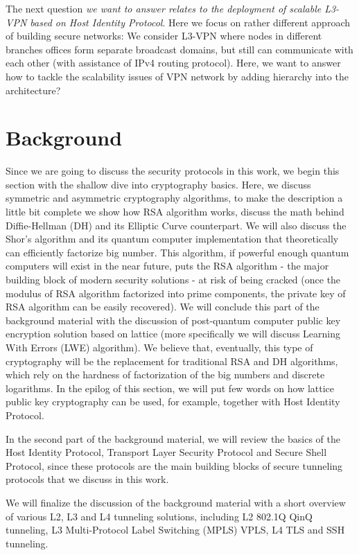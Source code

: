 The next question {\it we want to answer relates to the deployment of scalable L3-VPN 
based on Host Identity Protocol}. Here we focus on rather different approach of building 
secure networks: We consider L3-VPN where nodes in different branches offices form separate 
broadcast domains, but still can communicate with each other (with assistance of IPv4 
routing protocol). Here, we want to answer how to tackle the scalability issues of 
VPN network by adding hierarchy into the architecture?  


\chapter{Background}

Since we are going to discuss the security protocols in this work, we begin 
this section with the shallow dive into cryptography basics. Here, we discuss 
symmetric and asymmetric cryptography algorithms, to make the description a 
little bit complete we show how RSA algorithm works, discuss the math behind 
Diffie-Hellman (DH) and its Elliptic Curve counterpart. We will also discuss 
the Shor’s algorithm and its quantum computer implementation that theoretically 
can efficiently factorize big number. This algorithm, if powerful enough quantum 
computers will exist in the near future, puts the RSA algorithm - the major 
building block of modern security solutions - at risk of being cracked (once the 
modulus of RSA algorithm factorized into prime components, the private key of RSA 
algorithm can be easily recovered). We will conclude this part of the background 
material with the discussion of post-quantum computer public key encryption 
solution based on lattice (more specifically we will discuss Learning With Errors 
(LWE) algorithm). We believe that, eventually, this type of cryptography will be 
the replacement for traditional RSA and DH algorithms, which rely on the hardness 
of factorization of the big numbers and discrete logarithms. In the epilog of this 
section, we will put few words on how lattice public key cryptography can be used, 
for example, together with Host Identity Protocol.

In the second part of the background material, we will review the basics of the Host 
Identity Protocol, Transport Layer Security Protocol and Secure Shell Protocol, since 
these protocols are the main building blocks of secure tunneling protocols that we
discuss in this work.

We will finalize the discussion of the background material with a short overview of 
various L2, L3 and L4 tunneling solutions, including L2 802.1Q QinQ tunneling, 
L3 Multi-Protocol Label Switching (MPLS) VPLS, L4 TLS and SSH tunneling.


